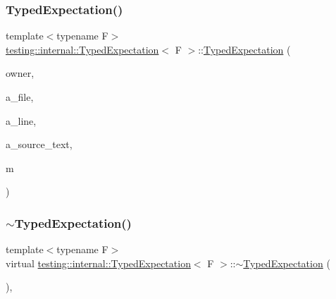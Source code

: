 \subsubsection{\texorpdfstring{Typed\+Expectation()}{TypedExpectation()}}
{\footnotesize\ttfamily template$<$typename F$>$ \\
\hyperlink{classtesting_1_1internal_1_1_typed_expectation}{testing\+::internal\+::\+Typed\+Expectation}$<$ F $>$\+::\hyperlink{classtesting_1_1internal_1_1_typed_expectation}{Typed\+Expectation} (\begin{DoxyParamCaption}\item[{\hyperlink{classtesting_1_1internal_1_1_function_mocker_base}{Function\+Mocker\+Base}$<$ F $>$ $\ast$}]{owner,  }\item[{const char $\ast$}]{a\+\_\+file,  }\item[{int}]{a\+\_\+line,  }\item[{const \hyperlink{namespacetesting_1_1internal_a8e8ff5b11e64078831112677156cb111}{string} \&}]{a\+\_\+source\+\_\+text,  }\item[{const \hyperlink{classtesting_1_1internal_1_1_typed_expectation_a8f10e3906761cc5c10fa3561c6e8938e}{Argument\+Matcher\+Tuple} \&}]{m }\end{DoxyParamCaption})\hspace{0.3cm}{\ttfamily [inline]}}

\mbox{\label{classtesting_1_1internal_1_1_typed_expectation_a4d73d7edd81f1b1418a33931fe728158}} 
\subsubsection{\texorpdfstring{$\sim$\+Typed\+Expectation()}{~TypedExpectation()}}
{\footnotesize\ttfamily template$<$typename F$>$ \\
virtual \hyperlink{classtesting_1_1internal_1_1_typed_expectation}{testing\+::internal\+::\+Typed\+Expectation}$<$ F $>$\+::$\sim$\hyperlink{classtesting_1_1internal_1_1_typed_expectation}{Typed\+Expectation} (\begin{DoxyParamCaption}{ }\end{DoxyParamCaption})\hspace{0.3cm}{\ttfamily [inline]}, {\ttfamily [virtual]}}



